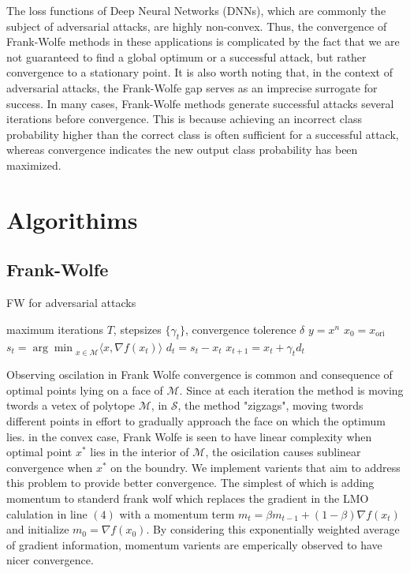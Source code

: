 \documentclass{article}
\begin{document}
The loss functions of Deep Neural Networks (DNNs), which are commonly the subject of adversarial attacks, are highly non-convex. Thus, the convergence of Frank-Wolfe methods in these applications is complicated by the fact that we are not guaranteed to find a global optimum or a successful attack, but rather convergence to a stationary point. 
It is also worth noting that, in the context of adversarial attacks, the Frank-Wolfe gap serves as an imprecise surrogate for success. In many cases, Frank-Wolfe methods generate successful attacks several iterations before convergence. This is because achieving an incorrect class probability higher than the correct class is often sufficient for a successful attack, whereas convergence indicates the new output class probability has been maximized.

\section{Algorithims}
\subsection{Frank-Wolfe}
\begin{algorithm}
\caption{FW for adversarial attacks}\label{alg:cap}
\begin{algorithmic}[1]
\Require maximum iterations $T$, stepsizes $\{\gamma_t\}$, convergence tolerence $\delta$
\Ensure $y = x^n$
\State $x_0 = x_{\text{ori}}$
	\State $s_t = {\arg \min}_{x\in\mathcal{M}} \langle x, \nabla f(x_t)\rangle$ 
	\State $d_t = s_t - x_t$
	\State $x_{t+1} = x_t + \gamma_t d_t$
	  \hfill {}
	\EndIf
\EndFor
\end{algorithmic}
\end{algorithm}

Observing oscilation in Frank Wolfe convergence is common and consequence of optimal points lying on a face of $\mathcal{M}$. Since at each iteration the method is moving twords a vetex of polytope $\mathcal{M}$, in $\mathcal{S}$, the method "zigzags", moving twords different points in effort to gradually approach the face on which the optimum lies. in the convex case, Frank Wolfe is seen to have linear complexity when optimal point $x^*$ lies in the interior of $\mathcal{M}$, the osicilation causes sublinear convergence when $x^*$ on the boundry.
 We implement varients that aim to address this problem to provide better convergence. The simplest of which is adding momentum to standerd frank wolf which replaces the gradient in the LMO calulation in line $(4)$ with a momentum term $m_t  = \beta m_{t-1} + (1-\beta) \nabla f(x_t)$ and initialize $m_0 = \nabla f(x_0)$. By considering this exponentially weighted average of gradient information, momentum varients are emperically observed to have nicer convergence. 
\end{document}
